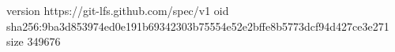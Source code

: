version https://git-lfs.github.com/spec/v1
oid sha256:9ba3d853974ed0e191b69342303b75554e52e2bffe8b5773dcf94d427ce3e271
size 349676
